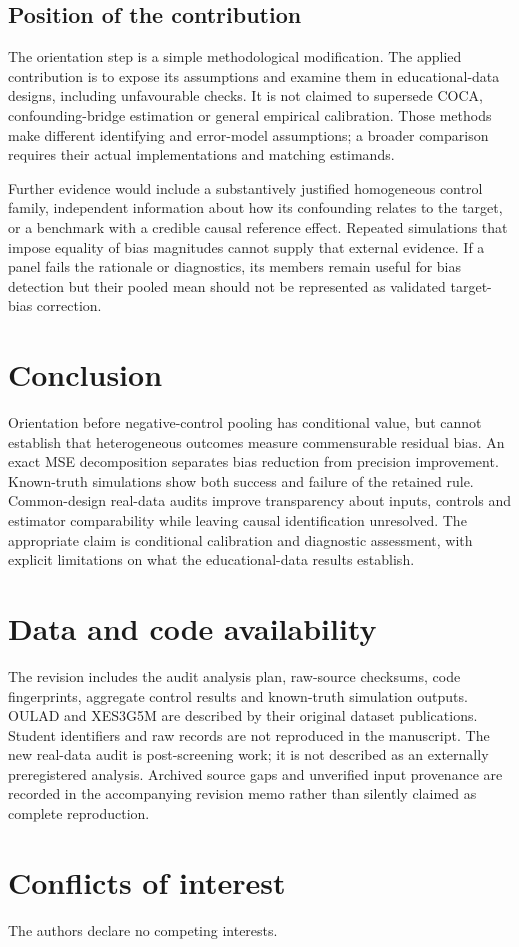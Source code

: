 \subsection{Position of the contribution}

The orientation step is a simple methodological modification. The applied contribution is to expose its assumptions and examine them in educational-data designs, including unfavourable checks. It is not claimed to supersede COCA, confounding-bridge estimation or general empirical calibration. Those methods make different identifying and error-model assumptions; a broader comparison requires their actual implementations and matching estimands.

Further evidence would include a substantively justified homogeneous control family, independent information about how its confounding relates to the target, or a benchmark with a credible causal reference effect. Repeated simulations that impose equality of bias magnitudes cannot supply that external evidence. If a panel fails the rationale or diagnostics, its members remain useful for bias detection but their pooled mean should not be represented as validated target-bias correction.

\section{Conclusion}

Orientation before negative-control pooling has conditional value, but cannot establish that heterogeneous outcomes measure commensurable residual bias. An exact MSE decomposition separates bias reduction from precision improvement. Known-truth simulations show both success and failure of the retained rule. Common-design real-data audits improve transparency about inputs, controls and estimator comparability while leaving causal identification unresolved. The appropriate claim is conditional calibration and diagnostic assessment, with explicit limitations on what the educational-data results establish.

\section*{Data and code availability}

The revision includes the audit analysis plan, raw-source checksums, code fingerprints, aggregate control results and known-truth simulation outputs. OULAD and XES3G5M are described by their original dataset publications. Student identifiers and raw records are not reproduced in the manuscript. The new real-data audit is post-screening work; it is not described as an externally preregistered analysis. Archived source gaps and unverified input provenance are recorded in the accompanying revision memo rather than silently claimed as complete reproduction.

\section*{Conflicts of interest}
The authors declare no competing interests.
